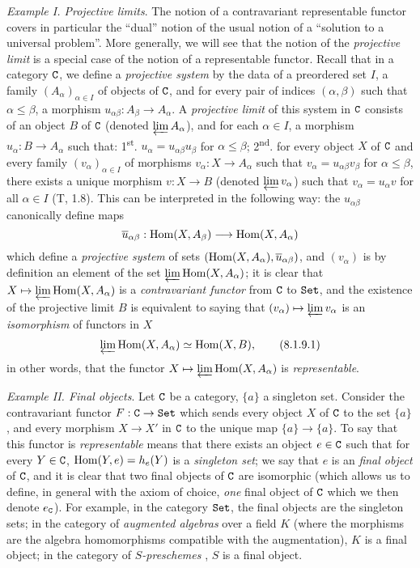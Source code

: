 \begin{env}[8.1.9]
\label{0.8.1.9}
\textit{Example I. Projective limits}.
The notion of a contravariant representable functor covers in particular the ``dual'' notion of the usual notion of a ``solution to a universal problem''.
More generally, we will see that the notion of the \emph{projective limit} is a special case of the notion of a representable functor.
Recall that in a category $\mathtt{C}$, we define a \emph{projective system} by the data of a preordered set $I$, a family $(A_\alpha)_{\alpha\in I}$ of objects of $\mathtt{C}$, and for every pair of indices $(\alpha,\beta)$ such that $\alpha\leq\beta$, a morphism $u_{\alpha\beta}:A_\beta\to A_\alpha$.
A \emph{projective limit} of this system in $\mathtt{C}$ consists of an object $B$ of $\mathtt{C}$ (denoted $\varprojlim A_\alpha$), and for each $\alpha\in I$, a morphism $u_\alpha:B\to A_\alpha$ such that: 1\textsuperscript{st}. $u_\alpha=u_{\alpha\beta}u_\beta$ for $\alpha\leq\beta$; 2\textsuperscript{nd}. for every object $X$ of $\mathtt{C}$ and every family $(v_\alpha)_{\alpha\in I}$ of morphisms $v_\alpha:X\to A_\alpha$ such that $v_\alpha=u_{\alpha\beta}v_\beta$ for $\alpha\leq\beta$, there exists a unique morphism $v:X\to B$ (denoted $\varprojlim v_\alpha$) such that $v_\alpha=u_\alpha v$ for all $\alpha\in I$ (T, 1.8).
This can be interpreted in the following way: the $u_{\alpha\beta}$ canonically define maps
\[
  \overline{u}_{\alpha\beta}:\Hom(X,A_\beta)\to\Hom(X,A_\alpha)
\]
which define a \emph{projective system} of sets $({\mathop{\mathrm{Hom}}\nolimits}(X,A_\alpha),\overline{u}_{\alpha\beta})$, and $(v_\alpha)$ is by definition an element of the set $\varprojlim{\mathop{\mathrm{Hom}}\nolimits}(X,A_\alpha)$; it is clear that $X\mapsto\varprojlim\Hom(X,A_\alpha)$ is a \emph{contravariant functor} from $\mathtt{C}$ to $\mathtt{Set}$, and the existence of the projective limit $B$ is equivalent to saying that $(v_\alpha)\mapsto\varprojlim v_\alpha$ is an \emph{isomorphism} of functors in $X$
\[
  \varprojlim{\mathop{\mathrm{Hom}}\nolimits}(X,A_\alpha)\simeq{\mathop{\mathrm{Hom}}\nolimits}(X,B),
  \tag{8.1.9.1}
\]
in other words, that the functor $X\mapsto\varprojlim\Hom(X,A_\alpha)$ is \emph{representable}.
\end{env}

\begin{env}[8.1.10]
\label{0.8.1.10}
\textit{Example II. Final objects}.
Let $\mathtt{C}$ be a category, $\{a\}$ a singleton set.
Consider the contravariant functor $F:\C\to\Set$ which sends every object $X$ of $\mathtt{C}$ to the set $\{a\}$, and every morphism $X\to X'$ in $\mathtt{C}$ to the unique map $\{a\}\to\{a\}$.
To say that this functor is \emph{representable} means that there exists an object $e\in\mathtt{C}$ such that for every $Y\in\mathtt{C}$, ${\mathop{\mathrm{Hom}}\nolimits}(Y,e)=h_e(Y)$ is a \emph{singleton set}; we say that $e$ is an \emph{final object} of $\mathtt{C}$, and it is clear that two final objects of $\mathtt{C}$ are isomorphic (which allows us to define, in general with the axiom of choice, \emph{one} final object of $\mathtt{C}$ which we then denote $e_\mathtt{C}$).
For example, in the category $\mathtt{Set}$, the final objects are the singleton sets; in the category of \emph{augmented algebras} over a field $K$ (where the morphisms are the algebra homomorphisms compatible with the augmentation), $K$ is a final object; in the category of \emph{$S$-preschemes} , $S$ is a final object.
\end{env}

